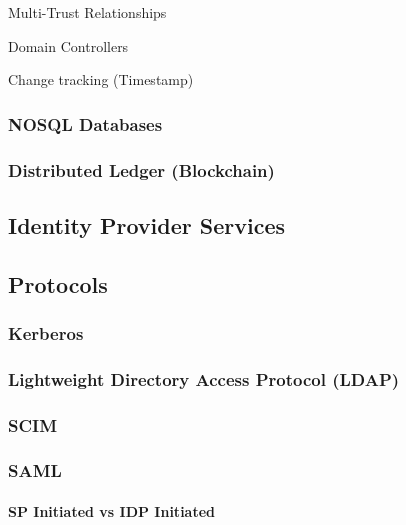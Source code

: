 Multi-Trust Relationships

Domain Controllers

Change tracking (Timestamp)

\hypertarget{nosql-databases}{%
\subsubsection{NOSQL Databases}\label{nosql-databases}}

\hypertarget{distributed-ledger-blockchain}{%
\subsubsection{Distributed Ledger
(Blockchain)}\label{distributed-ledger-blockchain}}

\hypertarget{identity-provider-services}{%
\subsection{Identity Provider
Services}\label{identity-provider-services}}

\hypertarget{protocols}{%
\subsection{Protocols}\label{protocols}}

\hypertarget{kerberos}{%
\subsubsection{Kerberos}\label{kerberos}}

\hypertarget{lightweight-directory-access-protocol-ldap}{%
\subsubsection{Lightweight Directory Access Protocol
(LDAP)}\label{lightweight-directory-access-protocol-ldap}}

\hypertarget{scim}{%
\subsubsection{SCIM}\label{scim}}

\hypertarget{saml}{%
\subsubsection{SAML}\label{saml}}

\hypertarget{sp-initiated-vs-idp-initiated}{%
\paragraph{SP Initiated vs IDP
Initiated}\label{sp-initiated-vs-idp-initiated}}

